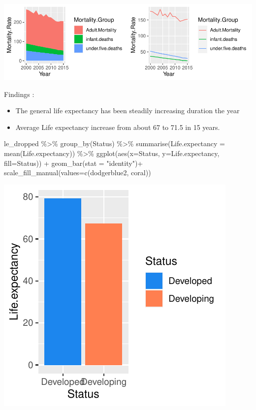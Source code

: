 \documentclass[
]{article}
\newenvironment{Shaded}{\begin{snugshade}}{\end{snugshade}}
\newcommand{\AttributeTok}[1]{\textcolor[rgb]{0.77,0.63,0.00}{#1}}
\newcommand{\FunctionTok}[1]{\textcolor[rgb]{0.00,0.00,0.00}{#1}}
\newcommand{\NormalTok}[1]{#1}
\newcommand{\SpecialCharTok}[1]{\textcolor[rgb]{0.00,0.00,0.00}{#1}}
\newcommand{\StringTok}[1]{\textcolor[rgb]{0.31,0.60,0.02}{#1}}
\providecommand{\tightlist}{%
  \setlength{\itemsep}{0pt}\setlength{\parskip}{0pt}}
\begin{document}
\includegraphics{583Project_files/figure-latex/unnamed-chunk-11-1.pdf}

Findings :

\begin{itemize}
\tightlist
\item
  The general life expectancy has been steadily increasing duration the
  year
\item
  Average Life expectancy increase from about 67 to 71.5 in 15 years.
\end{itemize}

\begin{Shaded}
\begin{Highlighting}[]
\NormalTok{le\_dropped }\SpecialCharTok{\%\textgreater{}\%}
  \FunctionTok{group\_by}\NormalTok{(Status) }\SpecialCharTok{\%\textgreater{}\%}
  \FunctionTok{summarise}\NormalTok{(}\AttributeTok{Life.expectancy =} \FunctionTok{mean}\NormalTok{(Life.expectancy)) }\SpecialCharTok{\%\textgreater{}\%}
  \FunctionTok{ggplot}\NormalTok{(}\FunctionTok{aes}\NormalTok{(}\AttributeTok{x=}\NormalTok{Status,}
             \AttributeTok{y=}\NormalTok{Life.expectancy,}
             \AttributeTok{fill=}\NormalTok{Status)) }\SpecialCharTok{+}    
  \FunctionTok{geom\_bar}\NormalTok{(}\AttributeTok{stat =} \StringTok{"identity"}\NormalTok{)}\SpecialCharTok{+} \FunctionTok{scale\_fill\_manual}\NormalTok{(}\AttributeTok{values=}\FunctionTok{c}\NormalTok{(}\StringTok{\textquotesingle{}dodgerblue2\textquotesingle{}}\NormalTok{, }\StringTok{\textquotesingle{}coral\textquotesingle{}}\NormalTok{))}
\end{Highlighting}
\end{Shaded}

\includegraphics{583Project_files/figure-latex/unnamed-chunk-12-1.pdf}
\end{document}

